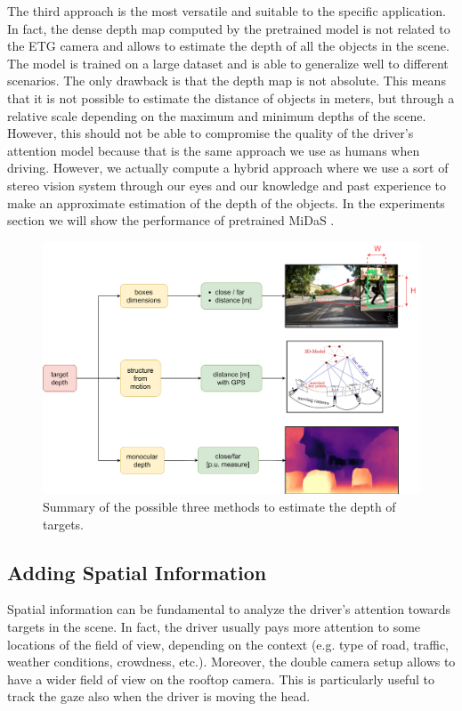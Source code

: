 The third approach is the most versatile and suitable to the specific application.
In fact, the dense depth map computed by the pretrained model is not related to the 
ETG camera and allows to estimate the depth of all the objects in the scene.
The model is trained on a large dataset and is able to generalize well to 
different scenarios. The only drawback is that the depth map is not absolute. 
This means that it is not possible to estimate the distance of objects in meters, 
but through a relative scale depending on the maximum and minimum depths of the 
scene. However, this should not be able to compromise the quality of the 
driver's attention model because that is the same approach we use as humans 
when driving. However, we actually compute a hybrid approach where we use a sort 
of stereo vision system through our eyes and our knowledge and past experience 
to make an approximate estimation of the depth of the objects.
In the experiments section we will show the performance of pretrained MiDaS 
\cite{midas}.

\begin{figure}
\centering
\includegraphics[width=\textwidth]{images/dreyeve/depth_estimation.png}
\caption{Summary of the possible three methods to estimate the depth of targets.}
\label{fig:depth_estimation}
\end{figure}



\subsection{Adding Spatial Information}
Spatial information can be fundamental to analyze the driver's attention 
towards targets in the scene. In fact, the driver usually pays more attention 
to some locations of the field of view, depending on the context (e.g. type of 
road, traffic, weather conditions, crowdness, etc.).
Moreover, the double camera setup allows to have a wider field of view on the 
rooftop camera. This is particularly useful to track the gaze also when the 
driver is moving the head. 

